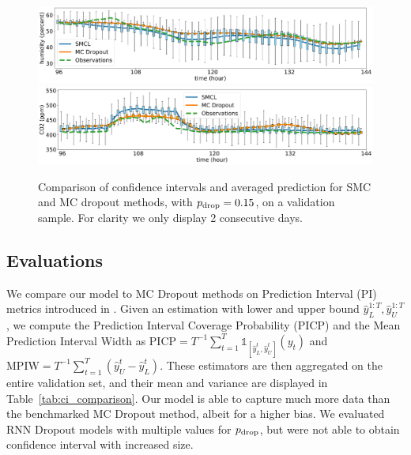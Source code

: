 \documentclass{article}
\begin{document}
\begin{figure}[htpb]
	\centering
	\includegraphics[width=.7\linewidth]{boxplot_comparison_hum.png}
	\includegraphics[width=.7\linewidth]{boxplot_comparison_co2.png}
	\caption{Comparison of confidence intervals and averaged prediction for SMC and MC dropout methods, with $p_\textnormal{drop}=0.15$, on a validation sample. For clarity we only display 2 consecutive days.}
	\label{fig:boxplot_comparison}
\end{figure}

\subsection{Evaluations}%
\label{sub:evaluations}

We compare our model to MC Dropout methods on Prediction Interval (PI) metrics introduced in \cite{Pearce2018}.
Given an estimation with lower and upper bound $\hat y_L^{1:T}, \hat y_U^{1:T}$, we compute the Prediction Interval Coverage Probability (PICP) and the Mean Prediction Interval Width as $\mathrm{PICP} = T^{-1}\sum^{T}_{t=1} \mathbb{1}_{[\hat y_L^t, \hat y_U^t]}(y_t)$ and $\mathrm{MPIW} = T^{-1} \sum^{T}_{t=1}(\hat y_U^t - \hat y_L^t)$.
These estimators are then aggregated on the entire validation set, and their mean and variance are displayed in Table~\ref{tab:ci_comparison}.
Our model is able to capture much more data than the benchmarked MC Dropout method, albeit for a higher bias.
We evaluated RNN Dropout models with multiple values for $p_\textnormal{drop}$, but were not able to obtain confidence interval with increased size.
\end{document}
